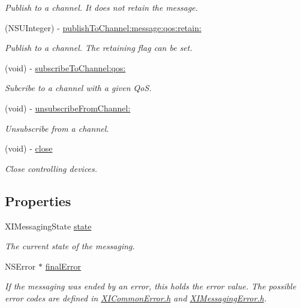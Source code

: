 \begin{DoxyCompactItemize}
\begin{DoxyCompactList}\small\item\em Publish to a channel. It does not retain the message. \end{DoxyCompactList}\item 
(N\+S\+U\+Integer) -\/ \hyperlink{protocol_x_i_messaging_01-p_acd6593199463654985e8ad5cf37eff9c}{publish\+To\+Channel\+:message\+:qos\+:retain\+:}
\begin{DoxyCompactList}\small\item\em Publish to a channel. The retaining flag can be set. \end{DoxyCompactList}\item 
(void) -\/ \hyperlink{protocol_x_i_messaging_01-p_a709f4377e80640789a751b71f1c7eb17}{subscribe\+To\+Channel\+:qos\+:}
\begin{DoxyCompactList}\small\item\em Subcribe to a channel with a given QoS. \end{DoxyCompactList}\item 
(void) -\/ \hyperlink{protocol_x_i_messaging_01-p_afe2bfff1aeb2eec7f7af7aab942d8711}{unsubscribe\+From\+Channel\+:}
\begin{DoxyCompactList}\small\item\em Unsubscribe from a channel. \end{DoxyCompactList}\item 
(void) -\/ \hyperlink{protocol_x_i_messaging_01-p_a60fca9e3ce704b7b34a28bfecab21eae}{close}
\begin{DoxyCompactList}\small\item\em Close controlling devices. \end{DoxyCompactList}\end{DoxyCompactItemize}
\subsection*{Properties}
\begin{DoxyCompactItemize}
\item 
X\+I\+Messaging\+State \hyperlink{protocol_x_i_messaging_01-p_aac43b2f050d63a882e6c372886078fe1}{state}
\begin{DoxyCompactList}\small\item\em The current state of the messaging. \end{DoxyCompactList}\item 
N\+S\+Error $\ast$ \hyperlink{protocol_x_i_messaging_01-p_a9c7cc05afa1414b88fa8892761818a07}{final\+Error}
\begin{DoxyCompactList}\small\item\em If the messaging was ended by an error, this holds the error value. The possible error codes are defined in \hyperlink{_x_i_common_error_8h}{X\+I\+Common\+Error.\+h} and \hyperlink{_x_i_messaging_error_8h}{X\+I\+Messaging\+Error.\+h}. \end{DoxyCompactList}\end{DoxyCompactItemize}


